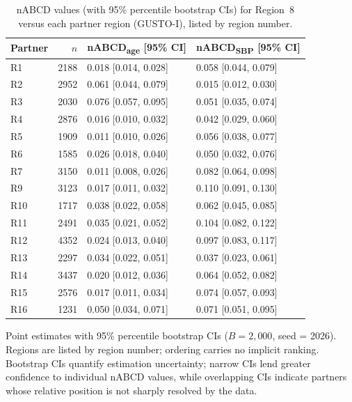 \begin{table}[ht]
\caption{nABCD values (with 95\% percentile bootstrap CIs) for Region~8 versus each partner region (GUSTO-I), listed by region number.\label{tab:gusto_nabcd}}
\begin{tabular*}{\textwidth}{@{\extracolsep\fill}lrll@{}}
\toprule
\textbf{Partner} & $n$ & \textbf{nABCD\textsubscript{age} [95\% CI]} & \textbf{nABCD\textsubscript{SBP} [95\% CI]} \\
\midrule
R1  & 2188 & 0.018 [0.014, 0.028] & 0.058 [0.044, 0.079] \\
R2  & 2952 & 0.061 [0.044, 0.079] & 0.015 [0.012, 0.030] \\
R3  & 2030 & 0.076 [0.057, 0.095] & 0.051 [0.035, 0.074] \\
R4  & 2876 & 0.016 [0.010, 0.032] & 0.042 [0.029, 0.060] \\
R5  & 1909 & 0.011 [0.010, 0.026] & 0.056 [0.038, 0.077] \\
R6  & 1585 & 0.026 [0.018, 0.040] & 0.050 [0.032, 0.076] \\
R7  & 3150 & 0.011 [0.008, 0.026] & 0.082 [0.064, 0.098] \\
R9  & 3123 & 0.017 [0.011, 0.032] & 0.110 [0.091, 0.130] \\
R10 & 1717 & 0.038 [0.022, 0.058] & 0.062 [0.045, 0.085] \\
R11 & 2491 & 0.035 [0.021, 0.052] & 0.104 [0.082, 0.122] \\
R12 & 4352 & 0.024 [0.013, 0.040] & 0.097 [0.083, 0.117] \\
R13 & 2297 & 0.034 [0.022, 0.051] & 0.037 [0.023, 0.061] \\
R14 & 3437 & 0.020 [0.012, 0.036] & 0.064 [0.052, 0.082] \\
R15 & 2576 & 0.017 [0.011, 0.034] & 0.074 [0.057, 0.093] \\
R16 & 1231 & 0.050 [0.034, 0.071] & 0.071 [0.051, 0.095] \\
\bottomrule
\end{tabular*}
\begin{tablenotes}
\item Point estimates with 95\% percentile bootstrap CIs ($B = 2{,}000$, seed = 2026). Regions are listed by region number; ordering carries no implicit ranking. Bootstrap CIs quantify estimation uncertainty; narrow CIs lend greater confidence to individual nABCD values, while overlapping CIs indicate partners whose relative position is not sharply resolved by the data.
\end{tablenotes}
\end{table}


